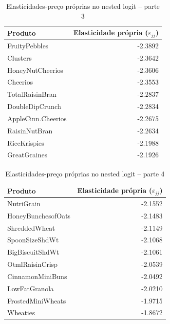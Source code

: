 \begin{table}[H]
\centering
\caption{Elasticidades-preço próprias no nested logit -- parte 3}
\label{tab:own-elasticities-nested-logit-parte-3}
\begin{tabular}{lr}
\toprule
Produto & Elasticidade própria ($\varepsilon_{jj}$) \\
\midrule
FruityPebbles & -2.3892 \\
Clusters & -2.3642 \\
HoneyNutCheerios & -2.3606 \\
Cheerios & -2.3553 \\
TotalRaisinBran & -2.2837 \\
DoubleDipCrunch & -2.2834 \\
AppleCinn.Cheerios & -2.2675 \\
RaisinNutBran & -2.2634 \\
RiceKrispies & -2.1988 \\
GreatGraines & -2.1926 \\
\bottomrule
\end{tabular}
\end{table}

\begin{table}[H]
\centering
\caption{Elasticidades-preço próprias no nested logit -- parte 4}
\label{tab:own-elasticities-nested-logit-parte-4}
\begin{tabular}{lr}
\toprule
Produto & Elasticidade própria ($\varepsilon_{jj}$) \\
\midrule
NutriGrain & -2.1552 \\
HoneyBunchesofOats & -2.1483 \\
ShreddedWheat & -2.1149 \\
SpoonSizeShdWt & -2.1068 \\
BigBiscuitShdWt & -2.1061 \\
OtmlRaisinCrisp & -2.0539 \\
CinnamonMiniBuns & -2.0492 \\
LowFatGranola & -2.0210 \\
FrostedMiniWheats & -1.9715 \\
Wheaties & -1.8672 \\
\bottomrule
\end{tabular}
\end{table}

